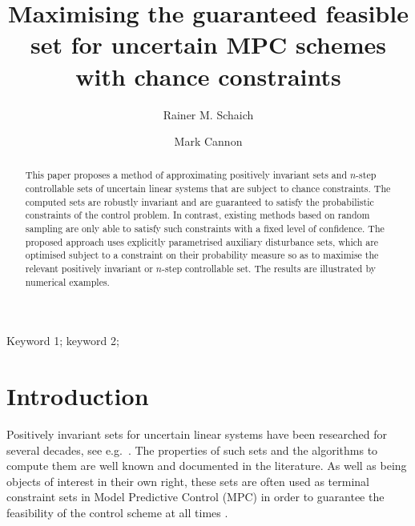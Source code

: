 \documentclass{ifacconf}
\begin{document}
\begin{frontmatter}

\title{Maximising the guaranteed feasible set for uncertain MPC schemes with chance constraints}%


\author{Rainer M. Schaich} 
\qquad\qquad\author{Mark Cannon}


\address{\mbox{Department of Engineering Science, University of Oxford, OX1 3PJ, UK} e-mail: \{rainer.schaich,mark.cannon\}@eng.ox.ac.uk}


          
\begin{keyword}                           %
Keyword 1; keyword 2;
\end{keyword}                             %


\begin{abstract}                          %
This paper proposes a method of approximating positively invariant sets and $n$-step controllable sets of uncertain linear systems that are subject to chance constraints. The computed sets are robustly invariant and are guaranteed to satisfy the probabilistic constraints of the control problem. In contrast, existing methods based on random sampling are only able to satisfy such constraints with a fixed level of confidence. The proposed approach uses explicitly parametrised auxiliary disturbance sets, which are optimised subject to a constraint on their probability measure so as to maximise the relevant positively invariant or $n$-step controllable set. The results are illustrated by numerical examples.
\end{abstract}

\end{frontmatter}


\section{Introduction}
%
%
Positively invariant sets for uncertain linear systems have been researched for several decades, see e.g.~\cite{Kolmanovsky:1995,Kolmanovsky:1998,blanchini:2007}.
%
The properties of such sets and the algorithms to compute them are well known and documented in the literature.
%
As well as being objects of interest in their own right,
these sets are often used as terminal constraint sets in Model Predictive Control (MPC) in order to guarantee the feasibility of the control scheme at all times \citep[see e.g.][]{Mayne2014}.
%
\end{document}

